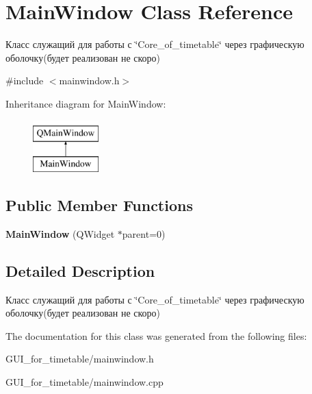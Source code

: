 \hypertarget{class_main_window}{}\section{Main\+Window Class Reference}
\label{class_main_window}


Класс служащий для работы с \char`\"{}\+Core\+\_\+of\+\_\+timetable\char`\"{} через графическую оболочку(будет реализован не скоро)  




{\ttfamily \#include $<$mainwindow.\+h$>$}

Inheritance diagram for Main\+Window\+:\begin{figure}[H]
\begin{center}
\leavevmode
\includegraphics[height=2.000000cm]{class_main_window}
\end{center}
\end{figure}
\subsection*{Public Member Functions}
\begin{DoxyCompactItemize}
\item 
{\bfseries Main\+Window} (Q\+Widget $\ast$parent=0)\hypertarget{class_main_window_a8b244be8b7b7db1b08de2a2acb9409db}{}\label{class_main_window_a8b244be8b7b7db1b08de2a2acb9409db}

\end{DoxyCompactItemize}


\subsection{Detailed Description}
Класс служащий для работы с \char`\"{}\+Core\+\_\+of\+\_\+timetable\char`\"{} через графическую оболочку(будет реализован не скоро) 

The documentation for this class was generated from the following files\+:\begin{DoxyCompactItemize}
\item 
G\+U\+I\+\_\+for\+\_\+timetable/mainwindow.\+h\item 
G\+U\+I\+\_\+for\+\_\+timetable/mainwindow.\+cpp\end{DoxyCompactItemize}
